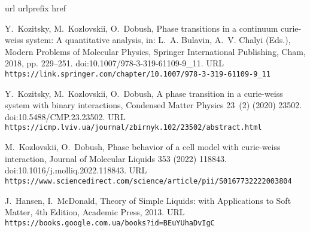 \documentclass[12pt]{article}
\begin{document}
	\begin{thebibliography}{1}
		\expandafter\ifx\csname url\endcsname\relax
		\def\url#1{\texttt{#1}}\fi
		\expandafter\ifx\csname urlprefix\endcsname\relax\def\urlprefix{URL }\fi
		\expandafter\ifx\csname href\endcsname\relax
		\def\href#1#2{#2} \def\path#1{#1}\fi
		
		Y.~Kozitsky, M.~Kozlovskii, O.~Dobush,
		\href{https://link.springer.com/chapter/10.1007/978-3-319-61109-9_11}{Phase
			transitions in a continuum curie-weiss system: A quantitative analysis}, in:
		L.~A. Bulavin, A.~V. Chalyi (Eds.), Modern Problems of Molecular Physics,
		Springer International Publishing, Cham, 2018, pp. 229--251.
		\newblock \href {https://doi.org/10.1007/978-3-319-61109-9_11}
		{\path{doi:10.1007/978-3-319-61109-9_11}}.
		\newline\urlprefix\url{https://link.springer.com/chapter/10.1007/978-3-319-61109-9_11}
		
		Y.~Kozitsky, M.~Kozlovskii, O.~Dobush,
		\href{https://icmp.lviv.ua/journal/zbirnyk.102/23502/abstract.html}{A phase
			transition in a curie-weiss system with binary interactions}, Condensed
		Matter Physics 23~(2) (2020) 23502.
		\newblock \href {https://doi.org/10.5488/CMP.23.23502}
		{\path{doi:10.5488/CMP.23.23502}}.
		\newline\urlprefix\url{https://icmp.lviv.ua/journal/zbirnyk.102/23502/abstract.html}
		
		M.~Kozlovskii, O.~Dobush,
		\href{https://www.sciencedirect.com/science/article/pii/S0167732222003804}{Phase
			behavior of a cell model with curie-weiss interaction}, Journal of Molecular
		Liquids 353 (2022) 118843.
		\newblock \href {https://doi.org/10.1016/j.molliq.2022.118843}
		{\path{doi:10.1016/j.molliq.2022.118843}}.
		\newline\urlprefix\url{https://www.sciencedirect.com/science/article/pii/S0167732222003804}
		
		J.~Hansen, I.~McDonald,
		\href{https://books.google.com.ua/books?id=BEuYUhaDvIgC}{Theory of Simple
			Liquids: with Applications to Soft Matter}, 4th Edition, Academic Press,
		2013.
		\newline\urlprefix\url{https://books.google.com.ua/books?id=BEuYUhaDvIgC}
		
	\end{thebibliography}
	
\end{document}
